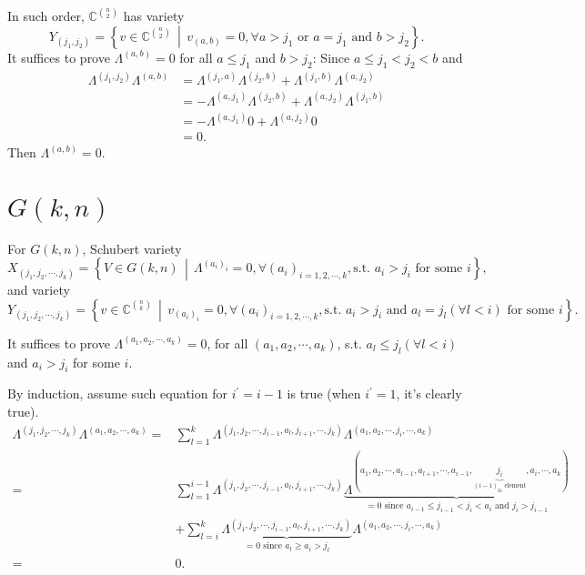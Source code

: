 \documentclass[11pt]{homework}
\begin{document}
In such order, $\mathbb{C}^{\binom{n}{2}}$ has variety
\begin{equation*}
    Y_{(j_1,j_2)} = \left\{ v \in \mathbb{C}^{\binom{n}{2}} \, \middle | \, v_{(a,b)} = 0, \forall a > j_1 \text{ or } a = j_1 \text{ and } b > j_2 \right\}.
\end{equation*}
It suffices to prove $\Lambda^{(a,b)}=0$ for all $a\leq j_1$ and $b > j_2$:
Since $a\leq j_1 < j_2 < b$ and 
\begin{align*}
    \Lambda^{(j_1,j_2)} \Lambda^{(a,b)} &= \Lambda^{(j_1,a)} \Lambda^{(j_2,b)} + \Lambda^{(j_1,b)} \Lambda^{(a,j_2)} \\
    &= - \Lambda^{(a,j_1)} \Lambda^{(j_2,b)} + \Lambda^{(a,j_2)} \Lambda^{(j_1,b)} \\
    &= - \Lambda^{(a,j_1)} 0 + \Lambda^{(a,j_2)} 0 \\
    &= 0.
\end{align*}
Then $\Lambda^{(a,b)}=0$.


\section{$G(k,n)$}
For $G(k,n)$, Schubert variety 
\begin{equation*}
    X_{(j_1,j_2, \cdots, j_k)} = \left\{V \in G(k, n) \, \middle | \, \Lambda^{(a_i)_{i}}=0, \forall (a_i)_{i=1,2,\cdots,k}, \text{s.t. } a_i > j_i \text{ for some } i \right\},
\end{equation*}
and variety
\begin{equation*}
    Y_{(j_1,j_2, \cdots, j_k)} = \left\{ v \in \mathbb{C}^{\binom{n}{k}} \, \middle | \, v_{(a_i)_{i}} = 0, \forall (a_i)_{i=1,2,\cdots,k}, \text{s.t. } a_i > j_i \text{ and } a_l = j_l (\forall l < i) \text{ for some } i \right\}.
\end{equation*}

It suffices to prove $\Lambda^{(a_1, a_2, \cdots, a_k)} = 0 $, for all $(a_1, a_2, \cdots, a_k)$, s.t. $a_l \leq j_l (\forall l < i)$ and $a_i > j_i$ for some $i$.

By induction, assume such equation for $i^\prime = i - 1$ is true (when $i^\prime = 1$, it's clearly true).
\begin{align*}
    \Lambda^{(j_1,j_2, \cdots, j_k)} \Lambda^{(a_1, a_2, \cdots, a_k)} =& \sum_{l=1}^{k} \Lambda^{(j_1,j_2, \cdots, j_{i-1}, a_{l}, j_{i+1}, \cdots, j_k)} \Lambda^{(a_1, a_2, \cdots, j_i, \cdots, a_k)}\\
    =& \sum_{l=1}^{i-1} \Lambda^{(j_1,j_2, \cdots, j_{i-1}, a_{l}, j_{i+1}, \cdots, j_k)} \underbrace{\Lambda^{(a_1, a_2, \cdots, a_{l-1}, a_{l+1}, \cdots, a_{i-1}, \underbrace{j_i}_{(i-1)_{\text{th}} \text{ element}}, a_i, \cdots, a_k)}}_{=0 \text{ since } a_{i-1} \leq j_{i-1} < j_i < a_i \text{ and } j_i > j_{i-1}}   \\ 
    &+ \sum_{l=i}^{k} \underbrace{\Lambda^{(j_1,j_2, \cdots, j_{i-1}, a_{l}, j_{i+1}, \cdots, j_k)}}_{=0 \text{ since } a_l \geq a_i > j_l} \Lambda^{(a_1, a_2, \cdots, j_i, \cdots, a_k)}\\
    =&0.
\end{align*}
\end{document}
